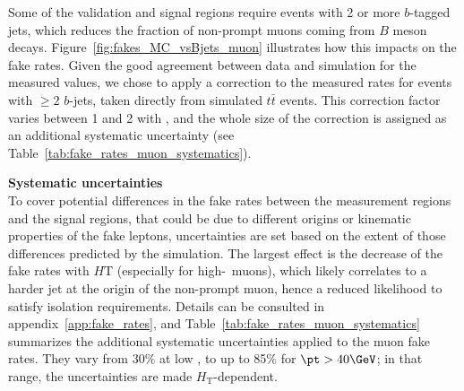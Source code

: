 Some of the validation and signal regions require events with 2 or more $b$-tagged jets, 
which reduces the fraction of non-prompt muons coming from $B$ meson decays. 
Figure~\ref{fig:fakes_MC_vsBjets_muon} illustrates how this impacts on the fake rates. 
Given the good agreement between data and simulation for the measured values, 
we chose to apply a correction to the measured rates for events with $\ge 2$ $b$-jets, 
taken directly from simulated $t\bar t$ events. 
This correction factor varies between 1 and 2 with \pt, 
and the whole size of the correction is assigned as an additional systematic uncertainty (see Table~\ref{tab:fake_rates_muon_systematics}). 

\begin{table}[t!]
\def\arraystretch{1.15}
\caption{Additional systematic uncertainty on the muon fake rates, to address variations of the latter in different environments. 
The table also shows the correction factors and uncertainties applied to final states with $\ge 2$ $b$-tagged jets.}
\label{tab:fake_rates_muon_systematics}
\def\arraystretch{1.15}
\centering
{}
\end{table}


\par{\bf Systematic uncertainties\\}
To cover potential differences in the fake rates between the measurement regions and the signal regions, 
that could be due to different origins or kinematic properties of the fake leptons, 
uncertainties are set based on the extent of those differences predicted by the simulation. 
The largest effect is the decrease of the fake rates with $H\mathrm{T}$ (especially for high-\pt\ muons), 
which likely correlates to a harder jet at the origin of the non-prompt muon, hence a reduced likelihood to satisfy isolation requirements. 
Details can be consulted in appendix~\ref{app:fake_rates}, 
and Table~\ref{tab:fake_rates_muon_systematics} summarizes the additional systematic uncertainties applied to the muon fake rates. 
They vary from $30\%$ at low \pt, to up to 85\% for $\pt>40 \GeV$; in that range, the uncertainties are made $H_\mathrm{T}$-dependent. 


